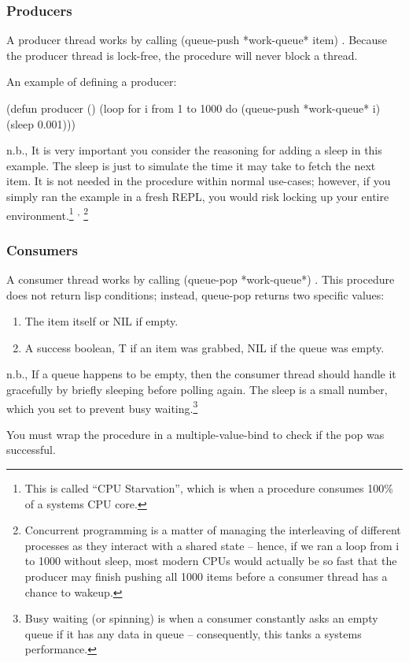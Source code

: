 \documentclass[12pt, letterpaper]{article}
\DeclareRobustCommand{\code}[1]{%
	\begingroup
	\setlength{\fboxsep}{2pt}%
	\colorbox{gray!15}{\ttfamily\small #1}%
	\endgroup
}
\newcommand{\supcom}{%
	\textsuperscript{,}
}
\begin{document}
	\subsubsection*{Producers}
	A producer thread works by calling \code{(queue-push *work-queue* item)}. Because the producer thread is lock-free, the procedure will never block a thread.
	
	An example of defining a producer:
\begin{lispcode}
(defun producer ()
(loop for i from 1 to 1000 do
(queue-push *work-queue* i)
(sleep 0.001)))
\end{lispcode}
	n.b., It is very important you consider the reasoning for adding a sleep in this example. The sleep is just to simulate the time it may take to fetch the next item. It is not needed in the procedure within normal use-cases; however, if you simply ran the example in a fresh REPL, you would risk locking up your entire environment.\footnote{This is called ``CPU Starvation'', which is when a procedure consumes 100\% of a systems CPU core.}\supcom\footnote{Concurrent programming is a matter of managing the interleaving of different processes as they interact with a shared state -- hence, if we ran a loop from i to 1000 without sleep, most modern CPUs would actually be so fast that the producer may finish pushing all 1000 items before a consumer thread has a chance to wakeup.}
	
	\subsubsection*{Consumers}
	A consumer thread works by calling \code{(queue-pop *work-queue*)}. This procedure does not return lisp conditions; instead, \code{queue-pop} returns two specific values:
	\begin{enumerate}
		\item The \code{item} itself or \code{NIL} if empty.
		\item A \code{success} boolean, \code{T} if an item was grabbed, \code{NIL} if the queue was empty.
	\end{enumerate}
	n.b., If a queue happens to be empty, then the consumer thread should handle it gracefully by briefly sleeping before polling again. The sleep is a small number, which you set to prevent busy waiting.\footnote{Busy waiting (or spinning) is when a consumer constantly asks an empty queue if it has any data in queue -- consequently, this tanks a systems performance.}
	
	You must wrap the procedure in a \code{multiple-value-bind} to check if the pop was successful.
	
\end{document}
